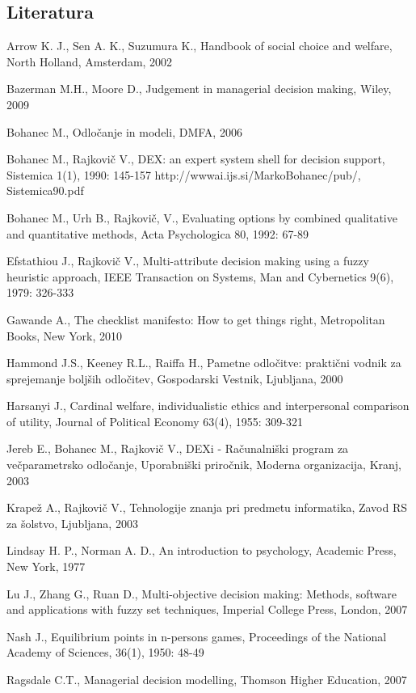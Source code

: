 \subsection*{Literatura}
\begin{description}
\item Arrow K. J., Sen A. K., Suzumura K., Handbook of social choice and welfare, North Holland, Amsterdam, 2002
\item Bazerman M.H., Moore D., Judgement in managerial decision making, Wiley, 2009
\item Bohanec M., Odločanje in modeli, DMFA, 2006
\item Bohanec M., Rajkovič V., DEX: an expert system shell for decision support, Sistemica 1(1), 1990: 145-157 http://wwwai.ijs.si/MarkoBohanec/pub/, Sistemica90.pdf
\item Bohanec M., Urh B., Rajkovič, V., Evaluating options by combined qualitative and quantitative methods, Acta Psychologica 80, 1992: 67-89
\item Efstathiou J., Rajkovič V., Multi-attribute decision making using a fuzzy heuristic approach, IEEE Transaction on Systems, Man and Cybernetics 9(6), 1979: 326-333
\item Gawande A., The checklist manifesto: How to get things right, Metropolitan Books, New York, 2010
\item Hammond J.S., Keeney R.L., Raiffa H., Pametne odločitve: praktični vodnik za sprejemanje boljših odločitev, Gospodarski Vestnik, Ljubljana, 2000
\item Harsanyi J., Cardinal welfare, individualistic ethics and interpersonal comparison of utility, Journal of Political Economy 63(4), 1955: 309-321
\item Jereb E., Bohanec M., Rajkovič V., DEXi - Računalniški program za večparametrsko odločanje, Uporabniški priročnik, Moderna organizacija, Kranj, 2003
\item Krapež A., Rajkovič V., Tehnologije znanja pri predmetu informatika, Zavod RS za šolstvo, Ljubljana, 2003
\item Lindsay H. P., Norman A. D., An introduction to psychology, Academic Press, New York, 1977
\item Lu J., Zhang G., Ruan D., Multi-objective decision making: Methods, software and applications with fuzzy set techniques, Imperial College Press, London, 2007
\item Nash J., Equilibrium points in n-persons games, Proceedings of the National Academy of Sciences, 36(1), 1950: 48-49
\item Ragsdale C.T., Managerial decision modelling, Thomson Higher Education, 2007

\end{description}
